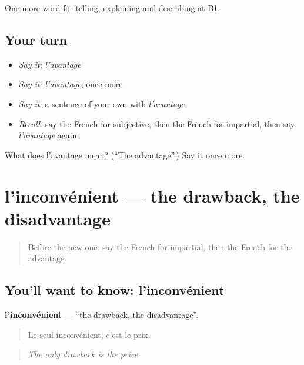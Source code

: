 \begin{grammarlens}[title={What you've built}]
One more word for telling, explaining and describing at B1.
\end{grammarlens}

\subsection*{Your turn}
\begin{itemize}
\raggedright
  \item \emph{Say it:} \emph{l'avantage}
  \item \emph{Say it:} \emph{l'avantage}, once more
  \item \emph{Say it:} a sentence of your own with \emph{l'avantage}
  \item \emph{Recall:} say the French for subjective, then the French for impartial, then say \emph{l'avantage} again
\end{itemize}

\begin{tcolorbox}[breakable,colback=teal!4,colframe=teal!35!black,title={Before you move on}]
What does l'avantage mean? (\textquotedblleft{}The advantage\textquotedblright{}.) Say it once more.
\end{tcolorbox}
\section[l'inconvénient]{l'inconvénient — the drawback, the disadvantage}

\label{lesson:FR-C343-inconvenient}



\begin{quote}
Before the new one: say the French for impartial, then the French for the advantage.
\end{quote}

\subsection*{You'll want to know: l'inconvénient}
\textbf{l'inconvénient} — \textquotedblleft{}the drawback, the disadvantage\textquotedblright{}.

\begin{quote}
Le seul inconvénient, c'est le prix.
\end{quote}

\begin{quote}
\emph{The only drawback is the price.}
\end{quote}

